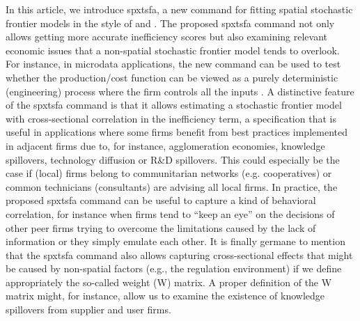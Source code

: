 In this article, we introduce spxtsfa, a new command for fitting spatial stochastic frontier models in the style of \cite{orea2019new} and \cite{galli2022spatial}. The proposed spxtsfa command not only allows getting more accurate inefficiency scores \citep[see e.g.][]{orea2018spatial} but also examining relevant economic issues that a non-spatial stochastic frontier model tends to overlook. For instance, in microdata applications, the new command can be used to test whether the production/cost function can be viewed as a purely deterministic (engineering) process where the firm controls all the inputs \citep[see e.g.][]{druska2004generalized}. A distinctive feature of the spxtsfa command is that it allows estimating a stochastic frontier model with cross-sectional correlation in the inefficiency term, a specification that is useful in applications where some firms benefit from best practices implemented in adjacent firms due to, for instance, agglomeration economies, knowledge spillovers, technology diffusion or R\&D spillovers. This could especially be the case if (local) firms belong to communitarian networks (e.g. cooperatives) or common technicians (consultants) are advising all local firms. In practice, the proposed spxtsfa command can be useful to capture a kind of behavioral correlation, for instance when firms tend to “keep an eye” on the decisions of other peer firms trying to overcome the limitations caused by the lack of information or they simply emulate each other. It is finally germane to mention that the spxtsfa command also allows capturing cross-sectional effects that might be caused by non-spatial factors (e.g., the regulation environment) if we define appropriately the so-called weight (W) matrix. A proper definition of the W matrix might, for instance, allow us to examine the existence of knowledge spillovers from supplier and user firms. 

